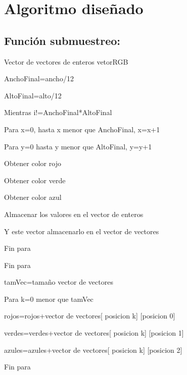 \documentclass{article}
\begin{document}
\section{Algoritmo diseñado}\label{Algoritmo}
\subsection{Función submuestreo: }

Vector de vectores de enteros
vetorRGB

AnchoFinal=ancho/12

AltoFinal=alto/12

Mientras i!=AnchoFinal*AltoFinal
    
\hspace{0.5cm}Para x=0, hasta x menor que AnchoFinal, x=x+1

\hspace{1cm}Para y=0 hasta y menor que AltoFinal, y=y+1

\hspace{1.5cm}Obtener color rojo

\hspace{1.5cm}Obtener color verde

\hspace{1.5cm}Obtener color azul

\hspace{1.5cm}Almacenar los valores en el vector de enteros

\hspace{1.5cm}Y este vector almacenarlo en el vector de vectores

\hspace{1cm}Fin para

\hspace{0.5cm}Fin para

\hspace{0.5cm}tamVec=tamaño vector de vectores

\hspace{0.5cm}Para k=0 menor que tamVec

\hspace{1cm}rojos=rojos+vector de vectores[ posicion k] [posicion 0]

\hspace{1cm}verdes=verdes+vector de vectores[ posicion k] [posicion 1]

\hspace{1cm}azules=azules+vector de vectores[ posicion k] [posicion 2]

\hspace{0.5cm}Fin para
\end{document}
